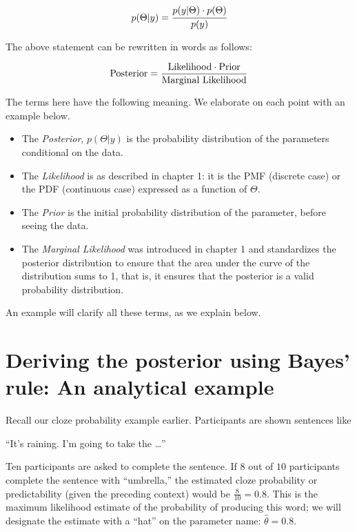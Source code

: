 \documentclass[12pt,]{krantz}
\theoremstyle{definition}
\theoremstyle{definition}
\theoremstyle{definition}
\theoremstyle{remark}
\begin{document}
\begin{equation}
p(\Theta|y) = \cfrac{ p(y|\Theta) \cdot p(\Theta) }{p(y)}
\label{eq:bayes}
\end{equation}

The above statement can be rewritten in words as follows:

\begin{equation}
\hbox{Posterior} = \frac{\hbox{Likelihood} \cdot \hbox{Prior}}{\hbox{Marginal Likelihood}}
\end{equation}

The terms here have the following meaning. We elaborate on each point
with an example below.

\begin{itemize}
\item
  The \emph{Posterior}, \(p(\Theta|y)\) is the probability distribution
  of the parameters conditional on the data.
\item
  The \emph{Likelihood} is as described in chapter 1: it is the PMF
  (discrete case) or the PDF (continuous case) expressed as a function
  of \(\Theta\).
\item
  The \emph{Prior} is the initial probability distribution of the
  parameter, before seeing the data.
\item
  The \emph{Marginal Likelihood} was introduced in chapter 1 and
  standardizes the posterior distribution to ensure that the area under
  the curve of the distribution sums to 1, that is, it ensures that the
  posterior is a valid probability distribution.
\end{itemize}

An example will clarify all these terms, as we explain below.

\section{Deriving the posterior using Bayes' rule: An analytical
example}\label{sec:analytical}

Recall our cloze probability example earlier. Participants are shown
sentences like

``It's raining. I'm going to take the \ldots{}''

Ten participants are asked to complete the sentence. If \(8\) out of
\(10\) participants complete the sentence with ``umbrella,'' the
estimated cloze probability or predictability (given the preceding
context) would be \(\frac{8}{10}=0.8\). This is the maximum likelihood
estimate of the probability of producing this word; we will designate
the estimate with a ``hat'' on the parameter name: \(\hat \theta=0.8\).
\end{document}
